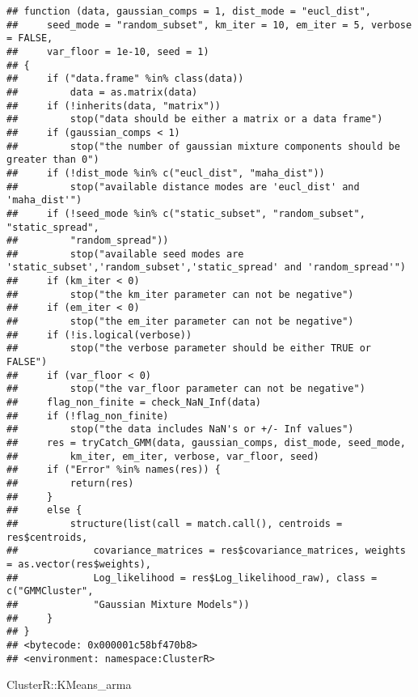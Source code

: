 \documentclass[
]{article}
\newenvironment{Shaded}{\begin{snugshade}}{\end{snugshade}}
\newcommand{\NormalTok}[1]{#1}
\newcommand{\SpecialCharTok}[1]{\textcolor[rgb]{0.00,0.00,0.00}{#1}}
\begin{document}
\begin{verbatim}
## function (data, gaussian_comps = 1, dist_mode = "eucl_dist", 
##     seed_mode = "random_subset", km_iter = 10, em_iter = 5, verbose = FALSE, 
##     var_floor = 1e-10, seed = 1) 
## {
##     if ("data.frame" %in% class(data)) 
##         data = as.matrix(data)
##     if (!inherits(data, "matrix")) 
##         stop("data should be either a matrix or a data frame")
##     if (gaussian_comps < 1) 
##         stop("the number of gaussian mixture components should be greater than 0")
##     if (!dist_mode %in% c("eucl_dist", "maha_dist")) 
##         stop("available distance modes are 'eucl_dist' and 'maha_dist'")
##     if (!seed_mode %in% c("static_subset", "random_subset", "static_spread", 
##         "random_spread")) 
##         stop("available seed modes are 'static_subset','random_subset','static_spread' and 'random_spread'")
##     if (km_iter < 0) 
##         stop("the km_iter parameter can not be negative")
##     if (em_iter < 0) 
##         stop("the em_iter parameter can not be negative")
##     if (!is.logical(verbose)) 
##         stop("the verbose parameter should be either TRUE or FALSE")
##     if (var_floor < 0) 
##         stop("the var_floor parameter can not be negative")
##     flag_non_finite = check_NaN_Inf(data)
##     if (!flag_non_finite) 
##         stop("the data includes NaN's or +/- Inf values")
##     res = tryCatch_GMM(data, gaussian_comps, dist_mode, seed_mode, 
##         km_iter, em_iter, verbose, var_floor, seed)
##     if ("Error" %in% names(res)) {
##         return(res)
##     }
##     else {
##         structure(list(call = match.call(), centroids = res$centroids, 
##             covariance_matrices = res$covariance_matrices, weights = as.vector(res$weights), 
##             Log_likelihood = res$Log_likelihood_raw), class = c("GMMCluster", 
##             "Gaussian Mixture Models"))
##     }
## }
## <bytecode: 0x000001c58bf470b8>
## <environment: namespace:ClusterR>
\end{verbatim}

\begin{Shaded}
\begin{Highlighting}[]
\NormalTok{ClusterR}\SpecialCharTok{::}\NormalTok{KMeans\_arma}
\end{Highlighting}
\end{Shaded}
\end{document}
